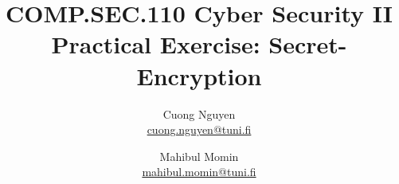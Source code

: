 \documentclass{article}
\title{COMP.SEC.110 Cyber Security II\\
    \large Practical Exercise: Secret-Encryption
}
\author{Cuong Nguyen\\ \href{mailto:cuong.nguyen@tuni.fi}{cuong.nguyen@tuni.fi} 
        \and Mahibul Momin\\ \href{mailto:mahibul.momin@tuni.fi}{mahibul.momin@tuni.fi}
}
\begin{document}
    
\maketitle
\tableofcontents
\newpage

\listoffigures
\newpage

% 
% 



\printbibliography{}
\end{document}
